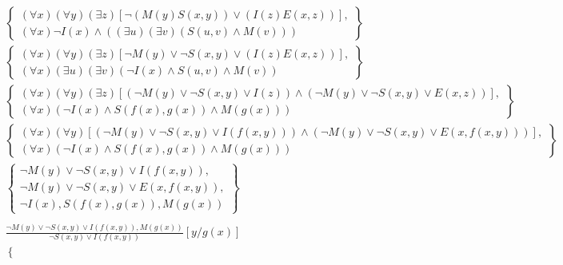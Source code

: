 \documentclass[12pt]{article}
\begin{document}
\begin{gather*}
  \left\{
    \begin{array}{c}
      \left(\forall x\right)\left(\forall y\right)\left(\exists z\right)\left[\neg\left(M(y)S(x,y)\right) \vee \left(I(z)E(x,z)\right)\right], \\
      \left(\forall x\right)\neg I(x)\wedge \left(\left(\exists u\right)\left(\exists v\right)\left(S(u, v) \wedge M(v)\right)\right)
    \end{array}
  \right\} \\
  \left\{
    \begin{array}{c}
      \left(\forall x\right)\left(\forall y\right)\left(\exists z\right)\left[\neg M(y) \vee \neg S(x,y) \vee \left(I(z)E(x,z)\right)\right], \\
      \left(\forall x\right)\left(\exists u\right)\left(\exists v\right)\left(\neg I(x)\wedge S(u, v) \wedge M(v)\right)
    \end{array}
  \right\} \\
  \left\{
    \begin{array}{c}
      \left(\forall x\right)\left(\forall y\right)\left(\exists z\right)\left[\left(\neg M(y) \vee \neg S(x,y) \vee I(z)\right) \wedge \left(\neg M(y) \vee \neg S(x,y) \vee E(x,z)\right)\right], \\
      \left(\forall x\right)\left(\neg I(x)\wedge S(f(x), g(x)) \wedge M(g(x))\right)
    \end{array}
  \right\} \\
  \left\{
    \begin{array}{c}
      \left(\forall x\right)\left(\forall y\right)\left[\left(\neg M(y) \vee \neg S(x,y) \vee I(f(x, y))\right) \wedge \left(\neg M(y) \vee \neg S(x,y) \vee E(x,f(x, y))\right)\right], \\
      \left(\forall x\right)\left(\neg I(x)\wedge S(f(x), g(x)) \wedge M(g(x))\right)
    \end{array}
  \right\} \\
  \left\{
    \begin{array}{c}
      \neg M(y) \vee \neg S(x,y) \vee I(f(x,y)), \\
      \neg M(y) \vee \neg S(x,y) \vee E(x,f(x,y)), \\
      \neg I(x), S(f(x), g(x)), M(g(x))
    \end{array}
  \right\} \\
  \\
  \frac{\neg M(y) \vee \neg S(x, y) \vee I(f(x, y)), M(g(x))}{\neg S(x, y) \vee I(f(x, y))}\left[y/g(x)\right] \\
  \left\{

\end{gather*}
\end{document}

